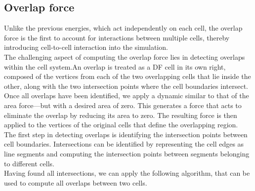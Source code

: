  

\subsection{Overlap force}
Unlike the previous energies, which act independently on each cell, the overlap force is the first to account for interactions between multiple cells, thereby introducing cell-to-cell interaction into the simulation. \\
The challenging aspect of computing the overlap force lies in detecting overlaps within the cell system.An overlap is treated as a DF cell in its own right, composed of the vertices from each of the two overlapping cells that lie inside the other, along with the two intersection points where the cell boundaries intersect. \\ 
Once all overlaps have been identified, we apply a dynamic similar to that of the area force—but with a desired area of zero. 
This generates a force that acts to eliminate the overlap by reducing its area to zero. 
The resulting force is then applied to the vertices of the original cells that define the overlapping region. \\
The first step in detecting overlaps is identifying the intersection points between cell boundaries.
Intersections can be identified by representing the cell edges as line segments and computing the intersection points between segments belonging to different cells. \\
Having found all intersections, we can apply the following algorithm, that can be used to compute all overlaps between two cells. 

